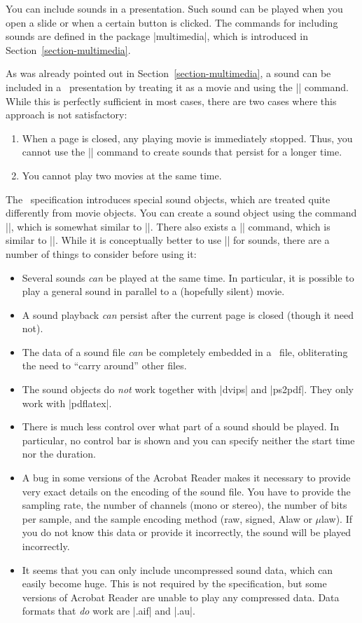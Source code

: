 You can include sounds in a presentation. Such sound can be played when you open a slide or when a certain button is clicked. The commands for including sounds are defined in the package |multimedia|, which is introduced in Section~\ref{section-multimedia}.

As was already pointed out in Section~\ref{section-multimedia}, a sound can be included in a \pdf\ presentation by treating it as a movie and using the |\movie| command. While this is perfectly sufficient in most cases, there are two cases where this approach is not satisfactory:
\begin{enumerate}
\item
  When a page is closed, any playing movie is immediately stopped. Thus, you cannot use the |\movie| command to create sounds that persist for a longer time.
\item
  You cannot play two movies at the same time.
\end{enumerate}

The \pdf\ specification introduces special sound objects, which are treated quite differently from movie objects. You can create a sound object using the command |\sound|, which is somewhat similar to |\movie|. There also exists a |\hyperlinksound| command, which is similar to |\hyperlinkmovie|. While it is conceptually better to use |\sound| for sounds, there are a number of things to consider before using it:
\begin{itemize}
\item
  Several sounds \emph{can} be played at the same time. In particular, it is possible to play a general sound in parallel to a (hopefully silent) movie.
\item
  A sound playback \emph{can} persist after the current page is closed (though it need not).
\item
  The data of a sound file \emph{can} be completely embedded in a \pdf\ file, obliterating the need to ``carry around'' other files.
\item
  The sound objects do \emph{not} work together with |dvips| and |ps2pdf|. They only work with |pdflatex|.
\item
  There is much less control over what part of a sound should be played. In particular, no control bar is shown and you can specify neither the start time nor the duration.
\item
  A bug in some versions of the Acrobat Reader makes it necessary to provide very exact details on the encoding of the sound file. You have to provide the sampling rate, the number of channels (mono or stereo), the number of bits per sample, and the sample encoding method (raw, signed, Alaw or $\mu$law). If you do not know this data or provide it incorrectly, the sound will be played incorrectly.
\item
  It seems that you can only include uncompressed sound data, which can easily become huge. This is not required by the specification, but some versions of Acrobat Reader are unable to play any compressed data. Data formats that \emph{do} work are |.aif| and |.au|.
\end{itemize}

